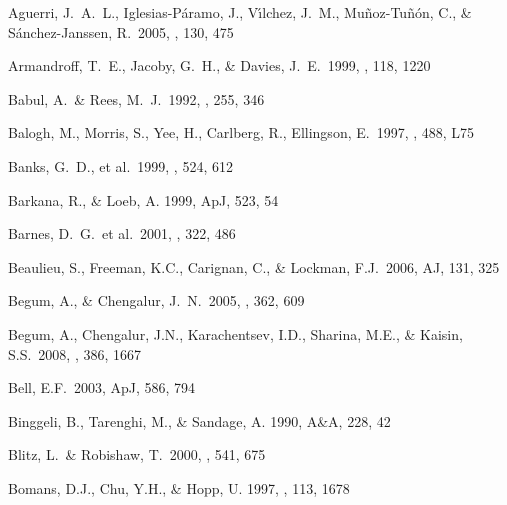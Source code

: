 \documentclass[12pt,preprint]{emulateapj}
\begin{document}


\begin{thebibliography}{}

Aguerri, J.~A.~L., Iglesias-P{\'a}ramo, J., V{\'{\i}}lchez, J.~M., 
Mu{\~n}oz-Tu{\~n}{\'o}n, C., \& S{\'a}nchez-Janssen, R.\ 2005, \aj, 130, 475 

Armandroff, T.~E., Jacoby, G.~H., \& Davies, J.~E.\ 1999, \aj, 118, 1220

Babul, A.~\& Rees, M.~J.\ 1992, \mnras, 255, 346 

Balogh, M., Morris, S., Yee, H., Carlberg, R., Ellingson, E.\ 1997, \apj, 488, L75 

Banks, G.~D., et al.\ 1999, \apj, 524, 612 

Barkana, R., \& Loeb, A. 1999, ApJ, 523, 54

Barnes, D.~G.~et al.\ 2001, \mnras, 322, 486 

Beaulieu, S., Freeman, K.C., Carignan, C., \&  Lockman, F.J.\ 2006, AJ, 131, 325 

Begum, A., \& Chengalur, J.~N.\ 2005, \mnras, 362, 609 

Begum, A., Chengalur, J.N., Karachentsev, I.D., Sharina, M.E., \& Kaisin, S.S.\ 2008, \mnras, 386, 1667

Bell, E.F.\ 2003, ApJ, 586, 794

Binggeli, B., Tarenghi, M., \& Sandage, A. 1990, A\&A, 228, 42

Blitz, L.~\& Robishaw, T.\ 2000, \apj, 541, 675 

Bomans, D.J., Chu, Y.H., \& Hopp, U. 1997, \aj , 113, 1678


\end{thebibliography}
\end{document}
